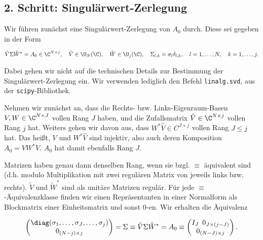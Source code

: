 \subsection*{2. Schritt: Singulärwert-Zerlegung}

Wir führen zunächst eine Singulärwert-Zerlegung von $A_0$ durch.
Diese sei gegeben in der Form

\begin{align*}
    \tilde V \Sigma \tilde W^\ast = A_0 \in \C^{N \times j},
    \quad
    \tilde V \in \U_N(\C),
    \quad
    \tilde W \in \U_j(\C),
    \quad
    \Sigma_{l, k} = \sigma_l \delta_{l, k},
    \quad
    l = 1, \dots, N,
    \quad
    k = 1, \dots, j.
\end{align*}

Dabei gehen wir nicht auf die technischen Details zur Bestimmung der Singulärwert-Zerlegung ein.
Wir verwenden lediglich den Befehl \texttt{linalg.svd}, aus der \texttt{scipy}-Bibliothek.

Nehmen wir zunächst an, dass die Rechts- bzw. Links-Eigenraum-Basen $V, W \in \C^{N \times J}$ vollen Rang $J$ haben, und die Zufallsmatrix $\hat V \in \C^{N \times j}$ vollen Rang $j$ hat.
Weiters gehen wir davon aus, dass $W^\ast \hat V \in C^{J \times j}$ vollen Rang $J \leq j$ hat.
Das heißt, $V$ und $W^\ast \hat V$ sind injektiv, also auch deren Komposition $A_0 = V W^\ast \hat V$.
$A_0$ hat damit ebenfalls Rang $J$.

Matrizen haben genau dann denselben Rang, wenn sie bzgl. $\equiv$ äquivalent sind (d.h. modulo Multiplikation mit zwei regulären Matrix von jeweils links bzw. rechts).
$\tilde V$ und $\tilde W^\ast$ sind als unitäre Matrizen regulär.
Für jede $\equiv$-Äquivalenzklasse finden wir einen Repräsentanten in einer Normalform als Blockmatrix einer Einheitsmatrix und sonst $0$-en.
Wir erhalten die Äquivalenz

\begin{align*}
    \begin{pmatrix}
        \diag(\sigma_1, \dots, \sigma_J, \dots, \sigma_j) \\
        0_{(N - j) \times j}
    \end{pmatrix}
    =
    \Sigma
    \equiv
    \tilde V \Sigma \tilde W^\ast
    =
    A_0
    \equiv
    \begin{pmatrix}
        I_J \enspace 0_{J \times (j - J)} \\ 0_{(N - J) \times j}
    \end{pmatrix}.
\end{align*}

